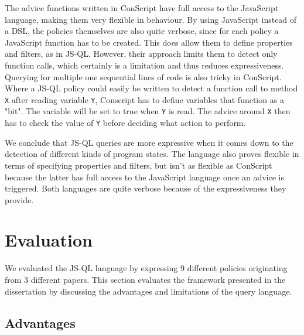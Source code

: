 The advice functions written in ConScript have full access to the JavaScript language, making them very flexible in behaviour. By using JavaScript instead of a DSL, the policies themselves are also quite verbose, since for each policy a JavaScript function has to be created. This does allow them to define properties and filters, as in JS-QL. However, their approach limits them to detect only function calls, which certainly is a limitation and thus reduces expressiveness. Querying for multiple one sequential lines of code is also tricky in ConScript. Where a JS-QL policy could easily be written to detect a function call to method \texttt{X} after reading variable \texttt{Y}, Conscript has to define variables that function as a "bit". The variable will be set to true when \texttt{Y} is read. The advice around \texttt{X} then has to check the value of \texttt{Y} before deciding what action to perform.

We conclude that JS-QL queries are more expressive when it comes down to the detection of different kinds of program states. The language also proves flexible in terms of specifying properties and filters, but isn't as flexible as ConScript because the latter has full access to the JavaScript language once an advice is triggered. Both languages are quite verbose because of the expressiveness they provide.


\section{Evaluation}
\label{sec:ValidationEvaluation}
We evaluated the JS-QL language by expressing 9 different policies originating from 3 different papers. This section evaluates the framework presented in the dissertation by discussing the advantages and limitations of the query language.

\subsection{Advantages}

